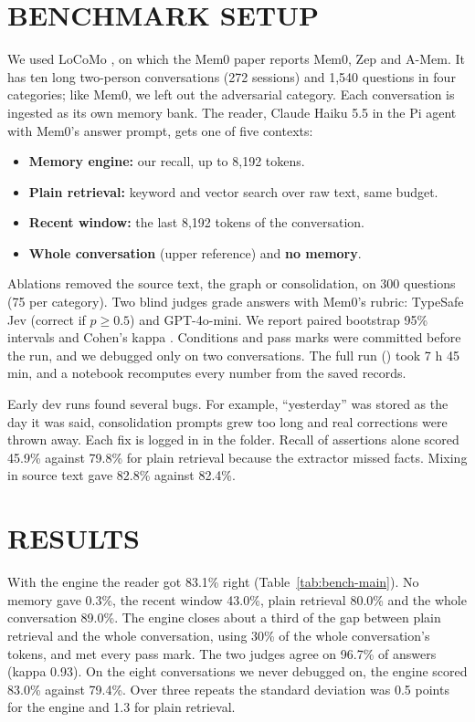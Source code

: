 \section{\uppercase{Benchmark Setup}}
\label{sec:setup}
We used LoCoMo \cite{maharana2024locomo}, on which the Mem0 paper \cite{chhikara2025mem0}
reports Mem0, Zep and A-Mem. It has ten long two-person conversations (272 sessions) and 1,540
questions in four categories; like Mem0, we left out the adversarial category. Each
conversation is ingested as its own memory bank. The reader, Claude Haiku 5.5 in the Pi agent
with Mem0's answer prompt, gets one of five contexts:
\begin{itemize}[itemsep=0pt]
\item \textbf{Memory engine:} our recall, up to 8,192 tokens.
\item \textbf{Plain retrieval:} keyword and vector search over raw text, same budget.
\item \textbf{Recent window:} the last 8,192 tokens of the conversation.
\item \textbf{Whole conversation} (upper reference) and \textbf{no memory}.
\end{itemize}
Ablations removed the source text, the graph or consolidation, on 300 questions (75 per
category). Two blind judges grade answers with Mem0's rubric: TypeSafe Jev
\cite{typesafe2026jev} (correct if $p \geq 0.5$) and GPT-4o-mini. We report paired bootstrap 95\%
intervals \cite{efron1993bootstrap} and Cohen's kappa \cite{cohen1960kappa}. Conditions and pass
marks were committed before the run, and we debugged only on two conversations. The full run
() took 7 h 45 min, and a notebook recomputes every number from
the saved records.

Early dev runs found several bugs. For example, ``yesterday'' was stored as the day it was
said, consolidation prompts grew too long and real corrections were thrown away. Each fix is
logged in  in the  folder. Recall of
assertions alone scored 45.9\% against 79.8\% for plain retrieval because the extractor missed
facts. Mixing in source text gave 82.8\% against 82.4\%.

\section{\uppercase{Results}}
\label{sec:results}
With the engine the reader got 83.1\% right (Table~\ref{tab:bench-main}). No memory gave 0.3\%,
the recent window 43.0\%, plain retrieval 80.0\% and the whole conversation 89.0\%. The engine
closes about a third of the gap between plain retrieval and the whole conversation, using 30\%
of the whole conversation's tokens, and met every pass mark. The two judges agree on 96.7\% of answers (kappa 0.93). On the eight conversations we
never debugged on, the engine scored 83.0\% against 79.4\%. Over three repeats the standard
deviation was 0.5 points for the engine and 1.3 for plain retrieval.

